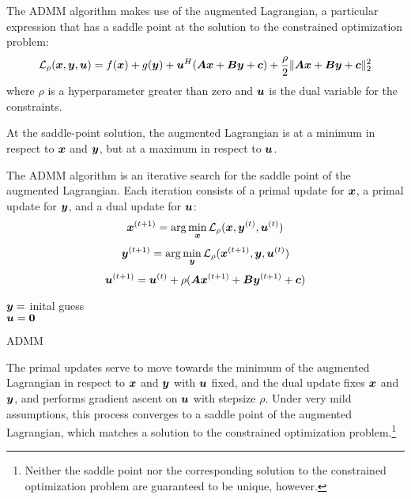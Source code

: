 The ADMM algorithm makes use of the augmented Lagrangian, a particular expression that has a saddle point at the solution to the constrained optimization problem:
%
\begin{equation}
\mathcal{L}_{\rho}(\bm{x},\bm{y},\bm{u}) = f(\bm{x}) + g(\bm{y}) + \bm{u}^H(\bm{A}\bm{x} + \bm{B}\bm{y} + \bm{c}) + \frac{\rho}{2}\|\bm{A}\bm{x} + \bm{B}\bm{y} + \bm{c}\|_2^2
\end{equation}
%
where $\rho$ is a hyperparameter greater than zero and $\bm{u}$ is the dual variable for the constraints.

At the saddle-point solution, the augmented Lagrangian is at a minimum in respect to $\bm{x}$ and $\bm{y}$, but at a maximum in respect to $\bm{u}$.

The ADMM algorithm is an iterative search for the saddle point of the augmented Lagrangian. Each iteration consists of a primal update for $\bm{x}$, a primal update for $\bm{y}$, and a dual update for $\bm{u}$:
%
\begin{equation}
\bm{x}^{(t + 1)} = \arg\min_{\bm{x}} \mathcal{L}_{\rho}(\bm{x},\bm{y}^{(t)},\bm{u}^{(t)})
\end{equation}
%
\begin{equation}
\bm{y}^{(t + 1)} = \arg\min_{\bm{y}} \mathcal{L}_{\rho}(\bm{x}^{(t + 1)},\bm{y},\bm{u}^{(t)})
\end{equation}
%
\begin{equation} \label{equation:general dual update}
\bm{u}^{(t + 1)} = \bm{u}^{(t)} + \rho(\bm{A}\bm{x}^{(t + 1)} + \bm{B}\bm{y}^{(t + 1)} + \bm{c})
\end{equation}
%
\begin{algorithm}[H]
\SetAlgoLined
   $\bm{y} = $ inital guess \\
   $\bm{u} = \bm{0}$ \\
 \caption{ADMM}
\end{algorithm}

The primal updates serve to move towards the minimum of the augmented Lagrangian in respect to $\bm{x}$ and $\bm{y}$ with $\bm{u}$ fixed, and the dual update fixes $\bm{x}$ and $\bm{y}$, and performs gradient ascent on $\bm{u}$ with stepsize $\rho$. Under very mild assumptions, this process converges to a saddle point of the augmented Lagrangian, which matches a solution to the constrained optimization problem.\footnote{Neither the saddle point nor the corresponding solution to the constrained optimization problem are guaranteed to be unique, however.}

